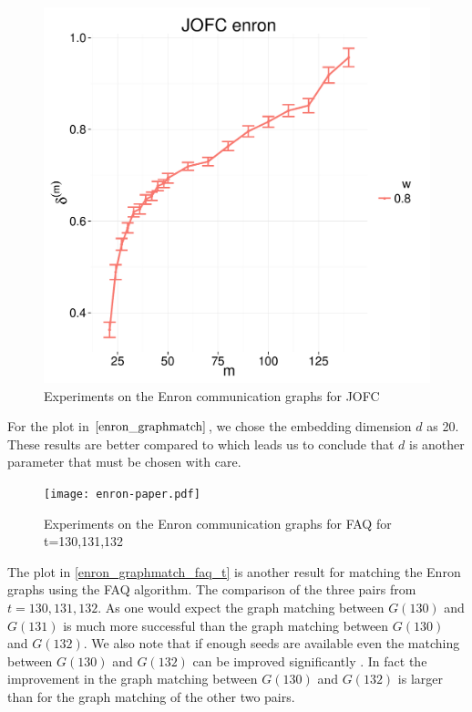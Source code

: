 \documentclass[12pt,oneside,final]{thesis}\usepackage[]{graphicx}\usepackage[]{color}
\begin{document}
\begin{figure}
\includegraphics[scale=0.75]{JOFC-enron_dim_20}
\caption{Experiments on the Enron communication graphs for JOFC \label{enron_graphmatch}}
\end{figure}

For the plot in  $\ref{enron_graphmatch}$, we chose the embedding dimension $d$ as 20. These results are better compared to \label{enron_graphmatch_faq_jofc} which leads us to conclude that $d$ is another parameter that must be chosen with care. 


\begin{figure}
\texttt{[image: enron-paper.pdf]}
\caption{Experiments on the Enron communication graphs for FAQ for t=130,131,132 \label{enron_graphmatch_faq_t}}
\end{figure}
The plot in \autoref{enron_graphmatch_faq_t} is another result for matching the Enron graphs using the FAQ algorithm. The comparison of the three pairs from $t=130,131,132$. As one would expect the graph matching between $G(130)$ and $G(131)$ is much more successful than    the graph matching between $G(130)$ and $G(132)$. We also note that if enough seeds are available even the matching between  $G(130)$ and $G(132)$ can be improved significantly . In fact the improvement in the graph matching between  $G(130)$ and $G(132)$  is larger than for the graph matching of the other two pairs.
\end{document}
